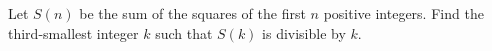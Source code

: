 Let $S(n)$ be the sum of the squares of the first $n$ positive integers. Find the third-smallest integer $k$ such that $S(k)$ is divisible by $k$.
